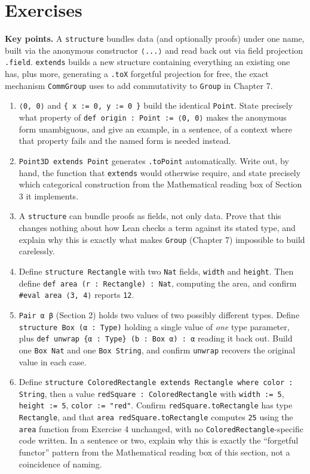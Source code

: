 \section{Exercises}\label{sec:03-functions-and-structures:04-exercises:1}

\textbf{Key points.} A \texttt{structure} bundles data (and optionally proofs) under one name, built via the anonymous constructor \texttt{⟨...⟩} and read back out via field projection \texttt{.field}. \texttt{extends} builds a new structure containing everything an existing one has, plus more, generating a \texttt{.toX} forgetful projection for free, the exact mechanism \texttt{CommGroup} uses to add commutativity to \texttt{Group} in Chapter 7.

\begin{enumerate}
\def\labelenumi{\arabic{enumi}.}
\item
  \texttt{⟨0, 0⟩} and \texttt{\{ x := 0, y := 0 \}} build the identical \texttt{Point}. State precisely what property of \texttt{def origin : Point := ⟨0, 0⟩} makes the anonymous form unambiguous, and give an example, in a sentence, of a context where that property fails and the named form is needed instead.
\item
  \texttt{Point3D extends Point} generates \texttt{.toPoint} automatically. Write out, by hand, the function that \texttt{extends} would otherwise require, and state precisely which categorical construction from the Mathematical reading box of Section 3 it implements.
\item
  A \texttt{structure} can bundle proofs as fields, not only data. Prove that this changes nothing about how Lean checks a term against its stated type, and explain why this is exactly what makes \texttt{Group} (Chapter 7) impossible to build carelessly.
\item
  Define \texttt{structure Rectangle} with two \texttt{Nat} fields, \texttt{width} and \texttt{height}. Then define \texttt{def area (r : Rectangle) : Nat}, computing the area, and confirm \texttt{\#eval area ⟨3, 4⟩} reports \texttt{12}.
\item
  \texttt{Pair α β} (Section 2) holds two values of two possibly different types. Define \texttt{structure Box (α : Type)} holding a single value of \emph{one} type parameter, plus \texttt{def unwrap \{α : Type\} (b : Box α) : α} reading it back out. Build one \texttt{Box Nat} and one \texttt{Box String}, and confirm \texttt{unwrap} recovers the original value in each case.
\item
  Define \texttt{structure ColoredRectangle extends Rectangle where color : String}, then a value \texttt{redSquare : ColoredRectangle} with \texttt{width := 5}, \texttt{height := 5}, \texttt{color := "red"}. Confirm \texttt{redSquare.toRectangle} has type \texttt{Rectangle}, and that \texttt{area redSquare.toRectangle} computes \texttt{25} using the \texttt{area} function from Exercise 4 unchanged, with no \texttt{ColoredRectangle}-specific code written. In a sentence or two, explain why this is exactly the ``forgetful functor'' pattern from the Mathematical reading box of this section, not a coincidence of naming.
\end{enumerate}

